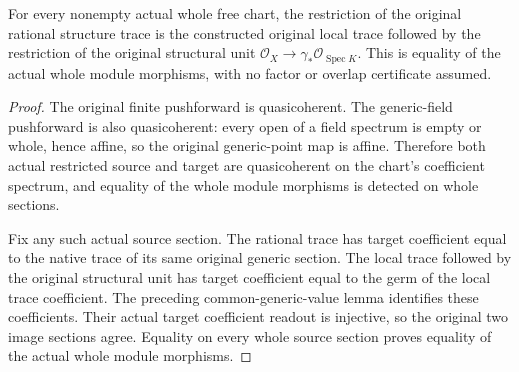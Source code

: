 \begin{lemma}
\label{lem:kn-structure-trace-local-regular-factor}
\leanok
For every nonempty actual whole free chart, the restriction of the
original rational structure trace is the constructed original local
trace followed by the restriction of the original structural unit
$\mathcal O_X\to\gamma_*\mathcal O_{\operatorname{Spec}K}$. This is
equality of the actual whole module morphisms, with no factor or
overlap certificate assumed.
\end{lemma}
\begin{proof}
The original finite pushforward is quasicoherent. The generic-field
pushforward is also quasicoherent: every open of a field spectrum is
empty or whole, hence affine, so the original generic-point map is
affine. Therefore both actual restricted source and target are
quasicoherent on the chart's coefficient spectrum, and equality of the
whole module morphisms is detected on whole sections.

Fix any such actual source section. The rational trace has target
coefficient equal to the native trace of its same original generic
section. The local trace followed by the original structural unit has
target coefficient equal to the germ of the local trace coefficient.
The preceding common-generic-value lemma identifies these coefficients.
Their actual target coefficient readout is injective, so the original
two image sections agree. Equality on every whole source section proves
equality of the actual whole module morphisms.
\end{proof}
